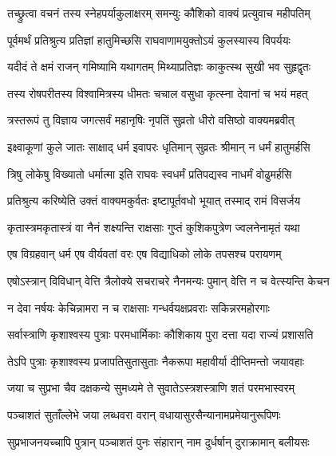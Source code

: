 
\twolineshloka
{तच्छ्रुत्वा वचनं तस्य स्नेहपर्याकुलाक्षरम्}
{समन्युः कौशिको वाक्यं प्रत्युवाच महीपतिम्} %

\twolineshloka
{पूर्वमर्थं प्रतिश्रुत्य प्रतिज्ञां हातुमिच्छसि}
{राघवाणामयुक्तोऽयं कुलस्यास्य विपर्ययः} %

\twolineshloka
{यदीदं ते क्षमं राजन् गमिष्यामि यथागतम्}
{मिथ्याप्रतिज्ञः काकुत्स्थ सुखी भव सुहृद्वृतः} %

\twolineshloka
{तस्य रोषपरीतस्य विश्वामित्रस्य धीमतः}
{चचाल वसुधा कृत्स्ना देवानां च भयं महत्} %

\twolineshloka
{त्रस्तरूपं तु विज्ञाय जगत्सर्वं महानृषिः}
{नृपतिं सुव्रतो धीरो वसिष्ठो वाक्यमब्रवीत्} %

\twolineshloka
{इक्ष्वाकूणां कुले जातः साक्षाद् धर्म इवापरः}
{धृतिमान् सुव्रतः श्रीमान् न धर्मं हातुमर्हसि} %

\twolineshloka
{त्रिषु लोकेषु विख्यातो धर्मात्मा इति राघवः}
{स्वधर्मं प्रतिपद्यस्व नाधर्मं वोढुमर्हसि} %

\twolineshloka
{प्रतिश्रुत्य करिष्येति उक्तं वाक्यमकुर्वतः}
{इष्टापूर्तवधो भूयात् तस्माद् रामं विसर्जय} %

\twolineshloka
{कृतास्त्रमकृतास्त्रं वा नैनं शक्ष्यन्ति राक्षसाः}
{गुप्तं कुशिकपुत्रेण ज्वलनेनामृतं यथा} %

\twolineshloka
{एष विग्रहवान् धर्म एष वीर्यवतां वरः}
{एष विद्याधिको लोके तपसश्च परायणम्} %

\twolineshloka
{एषोऽस्त्रान् विविधान् वेत्ति त्रैलोक्ये सचराचरे}
{नैनमन्यः पुमान् वेत्ति न च वेत्स्यन्ति केचन} %

\twolineshloka
{न देवा नर्षयः केचिन्नामरा न च राक्षसाः}
{गन्धर्वयक्षप्रवराः सकिन्नरमहोरगाः} %

\twolineshloka
{सर्वास्त्राणि कृशाश्वस्य पुत्राः परमधार्मिकाः}
{कौशिकाय पुरा दत्ता यदा राज्यं प्रशासति} %

\twolineshloka
{तेऽपि पुत्राः कृशाश्वस्य प्रजापतिसुतासुताः}
{नैकरूपा महावीर्या दीप्तिमन्तो जयावहाः} %

\twolineshloka
{जया च सुप्रभा चैव दक्षकन्ये सुमध्यमे}
{ते सुवातेऽस्त्रशस्त्राणि शतं परमभास्वरम्} %

\twolineshloka
{पञ्चाशतं सुताँल्लेभे जया लब्धवरा वरान्}
{वधायासुरसैन्यानामप्रमेयानुरूपिणः} %

\twolineshloka
{सुप्रभाजनयच्चापि पुत्रान् पञ्चाशतं पुनः}
{संहारान् नाम दुर्धर्षान् दुराक्रामान् बलीयसः} %

